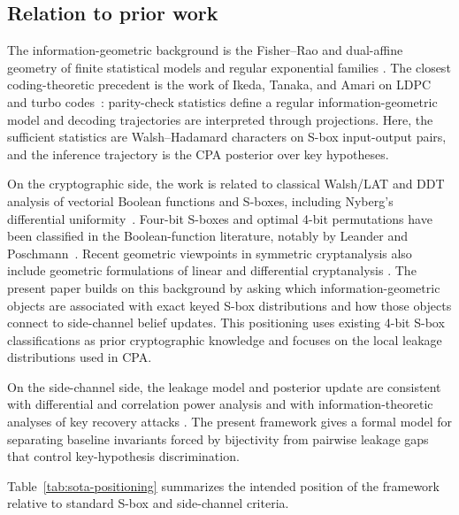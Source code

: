 \subsection{Relation to prior work}

The information-geometric background is the Fisher--Rao and dual-affine
geometry of finite statistical models and regular exponential families
\cite{amari2000methods,ay2017information,chentsov1982statistical}.  The
closest coding-theoretic precedent is the work of Ikeda, Tanaka, and Amari on
LDPC and turbo codes~\cite{ikeda2004information}: parity-check statistics
define a regular information-geometric model and decoding trajectories are
interpreted through projections.  Here, the sufficient statistics are
Walsh--Hadamard characters on S-box input-output pairs, and the inference
trajectory is the CPA posterior over key hypotheses.

On the cryptographic side, the work is related to classical Walsh/LAT and DDT
analysis of vectorial Boolean functions and S-boxes, including Nyberg's
differential uniformity~\cite{nyberg1994differentially}.  Four-bit S-boxes and
optimal 4-bit permutations have been classified in the Boolean-function
literature, notably by Leander and Poschmann~\cite{leander2007classification}.
Recent geometric viewpoints in symmetric cryptanalysis also include geometric
formulations of linear and differential cryptanalysis
\cite{beyne2021geometric,beyne2022quasidifferential}.
The present paper builds on this background by asking which
information-geometric objects are associated with exact keyed S-box
distributions and how those objects connect to side-channel belief updates.
This positioning uses existing 4-bit S-box classifications as prior
cryptographic knowledge and focuses on the local leakage distributions used in
CPA.

On the side-channel side, the leakage model and posterior update are consistent
with differential and correlation power analysis
\cite{kocher1999differential,brier2004correlation} and with
information-theoretic analyses of key recovery attacks
\cite{standaert2009unified,veyrat2009adaptive}.  The present framework gives a
formal model for separating baseline invariants forced by bijectivity from
pairwise leakage gaps that control key-hypothesis discrimination.

Table~\ref{tab:sota-positioning} summarizes the intended position of the
framework relative to standard S-box and side-channel criteria.

